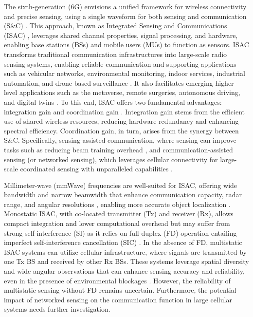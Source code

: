 \documentclass[journal]{IEEEtran}
\begin{document}
The sixth-generation (6G) envisions a unified framework for wireless connectivity and precise sensing, using a single waveform for both sensing and communication (S\&C) \cite{liu2022integrated,zhang2021enabling,cui2024integrated,lu2024integrated,wei2023integrated,wen2024survey}. This approach, known as Integrated Sensing and Communications (ISAC) \cite{liu2022integrated,zhang2021enabling}, leverages shared channel properties, signal processing, and hardware, enabling base stations (BSs) and mobile users (MUs) to function as sensors. 
ISAC transforms traditional communication infrastructures into large-scale radio sensing systems, enabling reliable communication and supporting applications such as vehicular networks, environmental monitoring, indoor services, industrial automation, and drone-based surveillance \cite{liu2022integrated,zhang2021enabling,cui2024integrated,lu2024integrated,wei2023integrated,wen2024survey}. It also facilitates emerging higher-level applications such as the metaverse, remote surgeries, autonomous driving, and digital twins \cite{liu2022integrated,zhang2021enabling,cui2024integrated,lu2024integrated,wei2023integrated,wen2024survey}.
To this end, ISAC offers two fundamental advantages: integration gain and coordination gain \cite{liu2022integrated,lu2024integrated}. Integration gain stems from the efficient use of shared wireless resources, reducing hardware redundancy and enhancing spectral efficiency. Coordination gain, in turn, arises from the synergy between S\&C. Specifically, sensing-assisted communication, where sensing can improve tasks such as reducing beam training overhead \cite{10433485}, and communication-assisted sensing (or networked sensing), which leverages cellular connectivity for large-scale coordinated sensing with unparalleled capabilities \cite{liu2022integrated,zhang2021enabling,cui2024integrated}.





Millimeter-wave (mmWave) frequencies are well-suited for ISAC, offering wide bandwidth and narrow beamwidth that enhance communication capacity, radar range, and angular resolutions \cite{liu2022integrated,cui2024integrated}, enabling more accurate object localization \cite{liu2022integrated,zhang2021enabling}. Monostatic ISAC, with co-located transmitter (Tx) and receiver (Rx), allows compact integration and lower computational overhead but may suffer from strong self-interference (SI) as it relies on full-duplex (FD) operation entailing imperfect self-interference cancellation (SIC) \cite{wei2023integrated}. In the absence of FD, multistatic ISAC systems can utilize cellular infrastructure, where signals are transmitted by one Tx BS and received by other Rx BSs. These systems leverage spatial diversity and wide angular observations that can enhance sensing accuracy and reliability, even in the presence of environmental blockages \cite{liu2022integrated,zhang2021enabling,cui2024integrated}.
However, the reliability of multistatic sensing without FD remains uncertain. Furthermore, the potential impact of networked sensing on the communication function in large cellular systems needs further investigation. 
\end{document}
